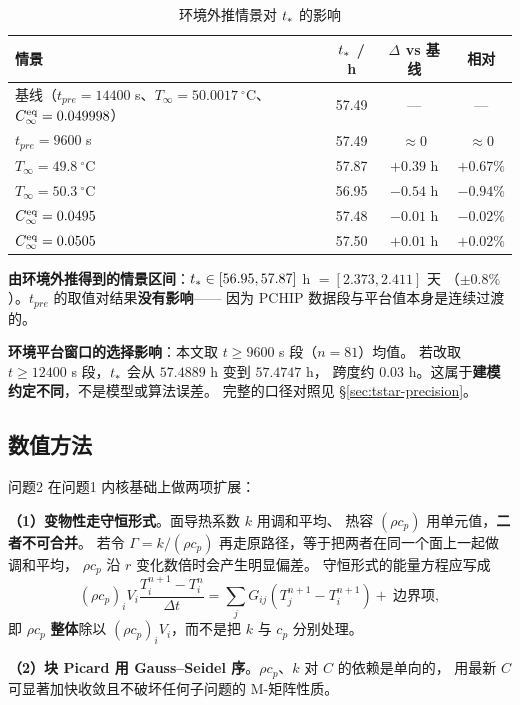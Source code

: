 \begin{table}[H]
  \centering
  \caption{环境外推情景对 $t_{*}$ 的影响}
  \label{tab:envsens}
  \footnotesize
  \begin{tabular}{@{}lccc@{}}
    \toprule
    情景 & $t_{*}$ / h & $\Delta$ vs 基线 & 相对 \\
    \midrule
    基线（$t_{pre}=14400$ s、$T_\infty=50.0017\ ^\circ$C、$C_\infty^{\mathrm{eq}}=0.049998$） & 57.49 & --- & --- \\
    $t_{pre}=9600$ s & 57.49 & $\approx0$ & $\approx0$ \\
    $T_\infty=49.8\ ^\circ$C & 57.87 & $+0.39$ h & $+0.67\%$ \\
    $T_\infty=50.3\ ^\circ$C & 56.95 & $-0.54$ h & $-0.94\%$ \\
    $C_\infty^{\mathrm{eq}}=0.0495$ & 57.48 & $-0.01$ h & $-0.02\%$ \\
    $C_\infty^{\mathrm{eq}}=0.0505$ & 57.50 & $+0.01$ h & $+0.02\%$ \\
    \bottomrule
  \end{tabular}
\end{table}

\textbf{由环境外推得到的情景区间}：$t_{*}\in[56.95,57.87]$ h $=[2.373,2.411]$ 天
（$\pm0.8\%$）。$t_{pre}$ 的取值对结果\textbf{没有影响}——
因为 PCHIP 数据段与平台值本身是连续过渡的。

\textbf{环境平台窗口的选择影响}：本文取 $t\ge9600$ s 段（$n=81$）均值。
若改取 $t\ge12400$ s 段，$t_{*}$ 会从 $57.4889$ h 变到 $57.4747$ h，
跨度约 $0.03$ h。这属于\textbf{建模约定不同}，不是模型或算法误差。
完整的口径对照见 \S\ref{sec:tstar-precision}。

\subsection{数值方法}

问题2 在问题1 内核基础上做两项扩展：

\textbf{（1）变物性走守恒形式}。面导热系数 $k$ 用调和平均、
热容 $(\rho c_p)$ 用单元值，\textbf{二者不可合并}。
若令 $\Gamma=k/(\rho c_p)$ 再走原路径，等于把两者在同一个面上一起做调和平均，
$\rho c_p$ 沿 $r$ 变化数倍时会产生明显偏差。
守恒形式的能量方程应写成
\begin{equation}
  \left(\rho c_p\right)_i V_i\frac{T_i^{n+1}-T_i^{n}}{\Delta t}
  =\sum_{j} G_{ij}\left(T_j^{n+1}-T_i^{n+1}\right)
  +\ \text{边界项},
\end{equation}
即 $\rho c_p$ \textbf{整体}除以 $(\rho c_p)_i V_i$，而不是把 $k$ 与 $c_p$ 分别处理。

\textbf{（2）块 Picard 用 Gauss--Seidel 序}。$\rho c_p$、$k$ 对 $C$ 的依赖是单向的，
用最新 $C$ 可显著加快收敛且不破坏任何子问题的 M-矩阵性质。

